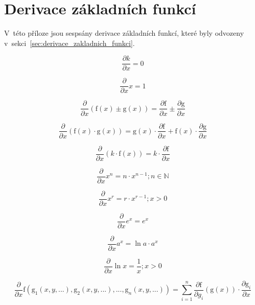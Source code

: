 \chapter{Derivace základních funkcí}
\label{ap:derivace_zakladnich_funkci}

V~této příloze jsou sespsány derivace základních funkcí, které byly odvozeny v~sekci~\ref{sec:derivace_zakladnich_funkci}.

\begin{equation}
\frac{\partial k}{\partial x} = 0
\end{equation}

\begin{equation}
\frac{\partial}{\partial x} x = 1
\end{equation}

\begin{equation}
\frac{\partial}{\partial x} (\mathrm{f}(x) \pm \mathrm{g}(x)) = \frac{\partial \mathrm{f}}{\partial x} \pm \frac{\partial \mathrm{g}}{\partial x}
\end{equation}

\begin{equation}
\frac{\partial}{\partial x} (\mathrm{f}(x) \cdot \mathrm{g}(x)) = \mathrm{g}(x) \cdot \frac{\partial \mathrm{f}}{\partial x} + \mathrm{f}(x) \cdot \frac{\partial \mathrm{g}}{\partial x}
\end{equation}

\begin{equation}
\frac{\partial}{\partial x} (k \cdot \mathrm{f}(x)) = k \cdot \frac{\partial \mathrm{f}}{\partial x}
\end{equation}

\begin{equation}
\frac{\partial}{\partial x} x^n = n \cdot x^{n-1}; n \in \mathbb{N}
\end{equation}

\begin{equation}
\frac{\partial}{\partial x} x^r = r \cdot x^{r-1}; x > 0
\end{equation}

\begin{equation}
\frac{\partial}{\partial x} e^x = e^x
\end{equation}

\begin{equation}
\frac{\partial}{\partial x} a^x = \ln a \cdot a^x
\end{equation}

\begin{equation}
\frac{\partial}{\partial x} \ln x = \frac{1}{x}; x > 0
\end{equation}

\begin{equation}
\frac{\partial}{\partial x} \mathrm{f} (\mathrm{g}_1(x, y, ...), \mathrm{g}_2(x, y, ...), ..., \mathrm{g}_n(x, y, ...)) = \sum_{i=1}^n \frac{\partial \mathrm{f}}{\partial g_i}(\mathrm{g}(x)) \cdot \frac{\partial \mathrm{g}_i}{\partial x}
\end{equation}
